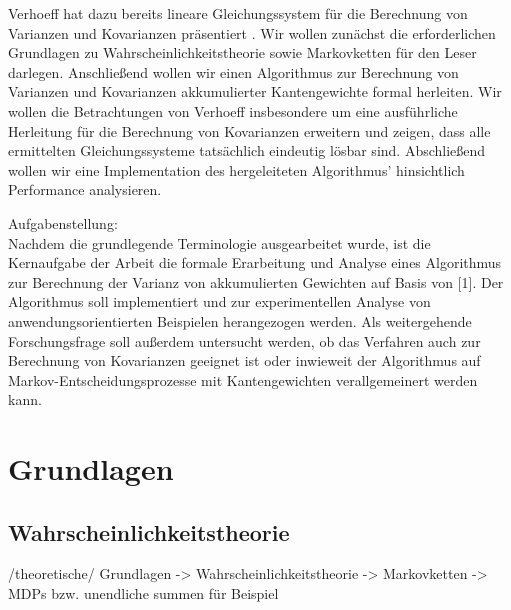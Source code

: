 \documentclass[a4paper]{article}
\theoremstyle{nonumberplain}
\begin{document}
Verhoeff hat dazu bereits lineare Gleichungssystem für die Berechnung von Varianzen und Kovarianzen präsentiert \cite{Verh04}. Wir wollen zunächst die erforderlichen Grundlagen zu Wahrscheinlichkeitstheorie sowie Markovketten für den Leser darlegen. Anschließend wollen wir einen Algorithmus zur Berechnung von Varianzen und Kovarianzen akkumulierter Kantengewichte formal herleiten. Wir wollen  die Betrachtungen von Verhoeff insbesondere um eine ausführliche Herleitung für die Berechnung von Kovarianzen erweitern und zeigen, dass alle ermittelten Gleichungssysteme tatsächlich eindeutig lösbar sind. Abschließend wollen wir eine Implementation des hergeleiteten Algorithmus' hinsichtlich Performance analysieren.

\begin{meta}
Aufgabenstellung:\\ 
Nachdem die grundlegende Terminologie ausgearbeitet wurde, ist die Kernaufgabe
der Arbeit die formale Erarbeitung und Analyse eines Algorithmus zur Berechnung
der Varianz von akkumulierten Gewichten auf Basis von [1]. Der Algorithmus soll implementiert und zur experimentellen Analyse von anwendungsorientierten Beispielen herangezogen werden.
Als weitergehende Forschungsfrage soll außerdem untersucht werden, ob das Verfahren auch zur Berechnung von Kovarianzen geeignet ist oder inwieweit der Algorithmus auf Markov-Entscheidungsprozesse mit Kantengewichten verallgemeinert werden kann.
\end{meta}

\section{Grundlagen}

\subsection{Wahrscheinlichkeitstheorie}

\begin{meta}
	/theoretische/ Grundlagen
	 -> Wahrscheinlichkeitstheorie
	 -> Markovketten
	 -> MDPs bzw. unendliche summen für Beispiel
\end{meta}
\end{document}
